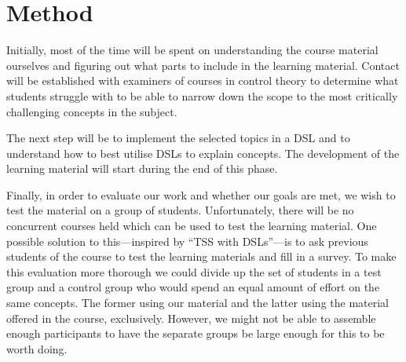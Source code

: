 \section{Method}
Initially, most of the time will be spent on understanding the course material ourselves and figuring out what parts to include in the learning material. Contact will be established with examiners of courses in control theory to determine what students struggle with to be able to narrow down the scope to the most critically challenging concepts in the subject. 

The next step will be to implement the selected topics in a DSL and to understand how to best utilise DSLs to explain concepts. The development of the learning material will start during the end of this phase. 

Finally, in order to evaluate our work and whether our goals are met, we wish to test the material on a group of students. Unfortunately, there will be no concurrent courses held which can be used to test the learning material. One possible solution to this---inspired by ``TSS with DSLs''---is to ask previous students of the course to test the learning materials and fill in a survey. %
To make this evaluation more thorough we could divide up the set of students in a test group and a control group who would spend an equal amount of effort on the same concepts. The former using our material and the latter using the material offered in the course, exclusively. However, we might not be able to assemble enough participants to have the separate groups be large enough for this to be worth doing.

\iffalse
produkt - 
kontinuerligt rapportera processen
kontakt med examinator
be studenter som gått/går kursen att ge respons
skriva en "bok" i latex
ev göra om boken till en hemsida

hur ska vi testa det?
prata med folk somh har läst kursen innan 

rapport - 


Känns som vi bör diskutera metod mer på nästa möte.
\fi

\iffalse
Metod/Genomförande
Hur gruppen tänkt sig att genomföra arbetet Olika deluppgifter/delstudier kräver ofta separata metodavsnitt.

Metodbeskrivningen förankras vanligen i metodlitteratur. 

Detta är typiskt ett avsnitt som uppdateras under arbetets gång
\fi